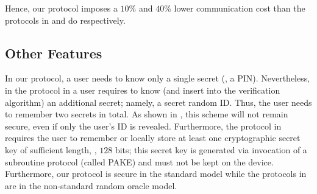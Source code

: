 Hence, our protocol imposes a $10\%$ and $40\%$ lower communication cost than the protocols in \cite{WangW18} and \cite{JareckiJKSS21} do respectively.


\subsection{Other Features}

 In our protocol, a user needs to know only a single secret (\ie, a  PIN). Nevertheless, in the protocol in \cite{WangW18} a user requires to know (and insert into the verification algorithm) an additional secret; namely, a secret random ID. Thus, the user needs to remember two secrets in total.  As shown in \cite{Scott12a}, this scheme will not remain secure, even if only the user's ID is revealed. Furthermore, the protocol in \cite{JareckiJKSS21} requires the user to remember or locally store at least one cryptographic secret key of sufficient length, \eg, $128$ bits; this secret key is generated via invocation of a subroutine protocol (called PAKE) and must not be kept on the device. 
 Furthermore, our protocol is secure in the standard model while the protocols in \cite{WangW18,JareckiJKSS21} are in the non-standard random oracle model. 

